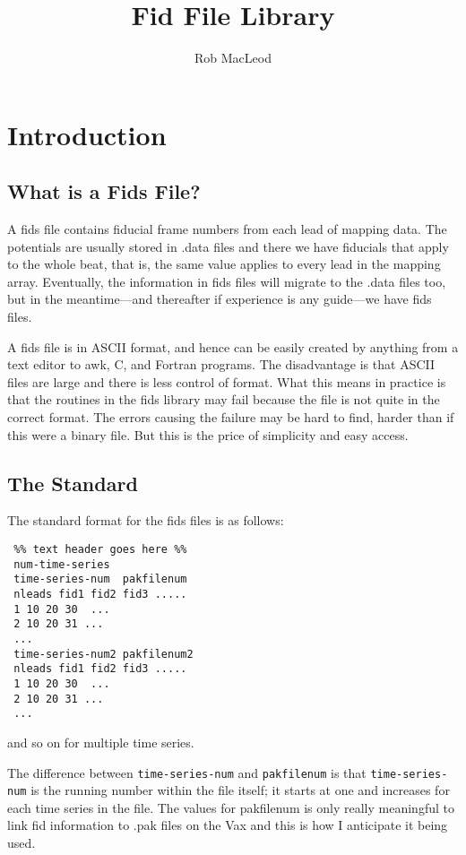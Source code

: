 \documentclass[11pt]{article}
\begin{document}
\title{Fid File Library}
\author{Rob MacLeod}

\maketitle

\section{Introduction}

\subsection{What is a Fids File?}

A fids file contains fiducial frame numbers from each lead of mapping
data.  The potentials are usually stored in .data files and there we have
fiducials that apply to the whole beat, that is, the same value applies to
every lead in the mapping array.  Eventually, the information in fids files
will migrate to the .data files too, but in the meantime---and thereafter
if experience is any guide---we have fids files.

A fids file is in ASCII format, and hence can be easily created by anything
from a text editor to awk, C, and Fortran programs.  The disadvantage is
that ASCII files are large and there is less control of format.  What this
means in practice is that the routines in the fids library may fail because
the file is not quite in the correct format.  The errors causing the
failure may be hard to find, harder than if this were a binary file.  But
this is the price of simplicity and easy access.

\subsection{ The Standard}

The standard format for the fids files is as follows:

\begin{verbatim}
 %% text header goes here %%
 num-time-series
 time-series-num  pakfilenum
 nleads fid1 fid2 fid3 .....
 1 10 20 30  ...
 2 10 20 31 ...
 ...
 time-series-num2 pakfilenum2 
 nleads fid1 fid2 fid3 .....
 1 10 20 30  ...
 2 10 20 31 ...
 ...
\end{verbatim}
%
and so on for multiple time series.  

The difference between {\tt time-series-num} and {\tt pakfilenum} is that 
{\tt time-series-num} is the running number within the file itself; 
it starts at one and increases for each time series in the file.  The 
values for pakfilenum is only really meaningful to link fid information to 
.pak files on the Vax and this is how I anticipate it being used.
\end{document}
